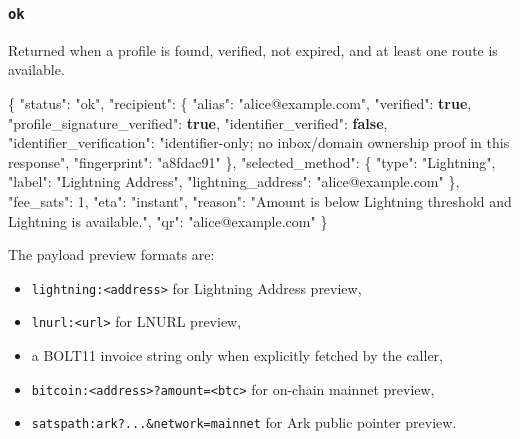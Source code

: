 \documentclass[
]{article}
\newenvironment{Shaded}{}{}
\newcommand{\DataTypeTok}[1]{\textcolor[rgb]{0.56,0.13,0.00}{#1}}
\newcommand{\DecValTok}[1]{\textcolor[rgb]{0.25,0.63,0.44}{#1}}
\newcommand{\FunctionTok}[1]{\textcolor[rgb]{0.02,0.16,0.49}{#1}}
\newcommand{\KeywordTok}[1]{\textcolor[rgb]{0.00,0.44,0.13}{\textbf{#1}}}
\newcommand{\StringTok}[1]{\textcolor[rgb]{0.25,0.44,0.63}{#1}}
\providecommand{\tightlist}{%
  \setlength{\itemsep}{0pt}\setlength{\parskip}{0pt}}
\begin{document}
\hypertarget{ok}{%
\subsubsection{\texorpdfstring{\texttt{ok}}{ok}}\label{ok}}

Returned when a profile is found, verified, not expired, and at least
one route is available.

\begin{Shaded}
\begin{Highlighting}[]
\FunctionTok{\{}
  \DataTypeTok{"status"}\FunctionTok{:} \StringTok{"ok"}\FunctionTok{,}
  \DataTypeTok{"recipient"}\FunctionTok{:} \FunctionTok{\{}
    \DataTypeTok{"alias"}\FunctionTok{:} \StringTok{"alice@example.com"}\FunctionTok{,}
    \DataTypeTok{"verified"}\FunctionTok{:} \KeywordTok{true}\FunctionTok{,}
    \DataTypeTok{"profile\_signature\_verified"}\FunctionTok{:} \KeywordTok{true}\FunctionTok{,}
    \DataTypeTok{"identifier\_verified"}\FunctionTok{:} \KeywordTok{false}\FunctionTok{,}
    \DataTypeTok{"identifier\_verification"}\FunctionTok{:} \StringTok{"identifier{-}only; no inbox/domain ownership proof in this response"}\FunctionTok{,}
    \DataTypeTok{"fingerprint"}\FunctionTok{:} \StringTok{"a8fdac91"}
  \FunctionTok{\},}
  \DataTypeTok{"selected\_method"}\FunctionTok{:} \FunctionTok{\{}
    \DataTypeTok{"type"}\FunctionTok{:} \StringTok{"Lightning"}\FunctionTok{,}
    \DataTypeTok{"label"}\FunctionTok{:} \StringTok{"Lightning Address"}\FunctionTok{,}
    \DataTypeTok{"lightning\_address"}\FunctionTok{:} \StringTok{"alice@example.com"}
  \FunctionTok{\},}
  \DataTypeTok{"fee\_sats"}\FunctionTok{:} \DecValTok{1}\FunctionTok{,}
  \DataTypeTok{"eta"}\FunctionTok{:} \StringTok{"instant"}\FunctionTok{,}
  \DataTypeTok{"reason"}\FunctionTok{:} \StringTok{"Amount is below Lightning threshold and Lightning is available."}\FunctionTok{,}
  \DataTypeTok{"qr"}\FunctionTok{:} \StringTok{"alice@example.com"}
\FunctionTok{\}}
\end{Highlighting}
\end{Shaded}

The payload preview formats are:

\begin{itemize}
\tightlist
\item
  \texttt{lightning:\textless{}address\textgreater{}} for Lightning
  Address preview,
\item
  \texttt{lnurl:\textless{}url\textgreater{}} for LNURL preview,
\item
  a BOLT11 invoice string only when explicitly fetched by the caller,
\item
  \texttt{bitcoin:\textless{}address\textgreater{}?amount=\textless{}btc\textgreater{}}
  for on-chain mainnet preview,
\item
  \texttt{satspath:ark?...\&network=mainnet} for Ark public pointer
  preview.
\end{itemize}
\end{document}
